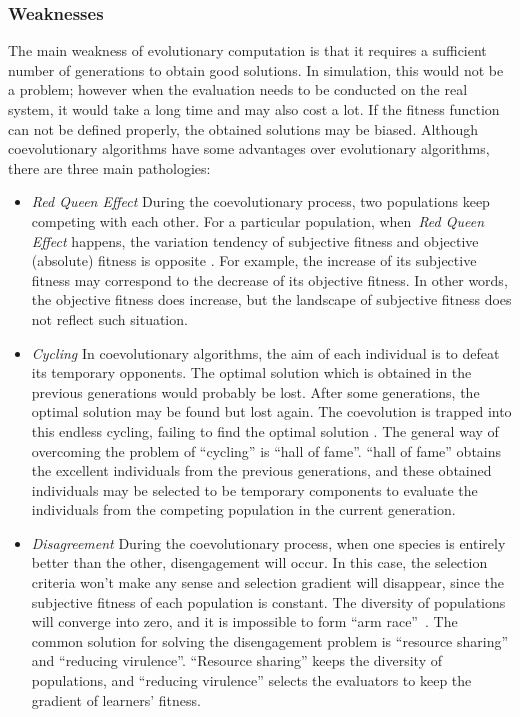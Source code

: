 \subsubsection{Weaknesses}

The main weakness of evolutionary computation is that it requires a sufficient number of generations to obtain good solutions. In simulation, this would not be a problem; however when the evaluation needs to be conducted on the real system, it would take a long time and may also cost a lot. If the fitness function can not be defined properly, the obtained solutions may be biased. Although coevolutionary algorithms have some advantages over evolutionary algorithms, there are three main pathologies:

\begin{itemize}
\item \textit{Red Queen Effect} During the coevolutionary process, two populations keep competing with each other. For a particular population, when~\textit{Red Queen Effect} happens, the variation tendency of subjective fitness and objective (absolute) fitness is opposite \cite{kauffman1995}. For example, the increase of its subjective fitness may correspond to the decrease of its objective fitness. In other words, the objective fitness does increase, but the landscape of subjective fitness does not reflect such situation. 

\item \textit{Cycling} In coevolutionary algorithms, the aim of each individual is to defeat its temporary opponents. The optimal solution which is obtained in the previous generations would probably be lost. After some generations, the optimal solution may be found but lost again. The coevolution is trapped into this endless cycling, failing to find the optimal solution \cite{John_2004}. The general way of overcoming the problem of ``cycling'' is ``hall of fame''\cite{Rosin_1997}. ``hall of fame'' obtains the excellent individuals from the previous generations, and these obtained individuals may be selected to be temporary components to evaluate the individuals from the competing population in the current generation.

\item \textit{Disagreement} During the coevolutionary process, when one species is entirely better than the other, disengagement will occur. In this case, the selection criteria won't make any sense and selection gradient will disappear, since the subjective fitness of each population is constant. The diversity of populations will converge into zero, and it is impossible to form ``arm race''~\cite{Dawkins_1979}. The common solution for solving the disengagement problem is ``resource sharing'' and ``reducing virulence''\cite{John_2004}. ``Resource sharing'' keeps the diversity of populations, and ``reducing virulence'' selects the evaluators to keep the gradient of learners' fitness.

\end{itemize}

